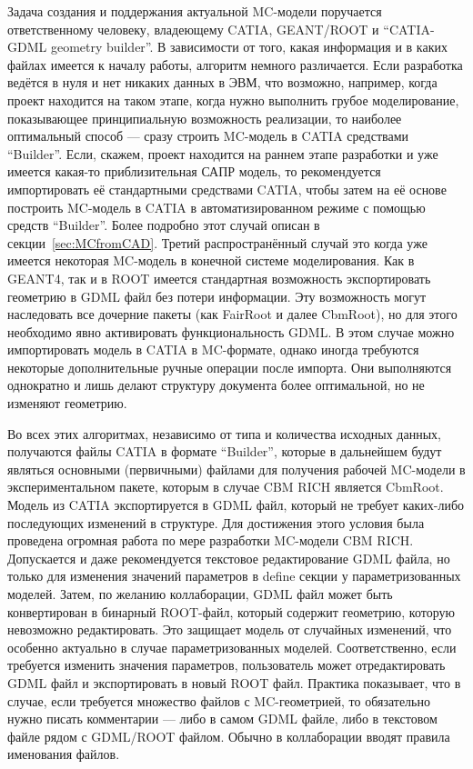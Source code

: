 Задача создания и поддержания актуальной MC-модели поручается ответственному человеку, владеющему CATIA, GEANT/ROOT и ``CATIA-GDML geometry builder''. В зависимости от того, какая информация и в каких файлах имеется к началу работы, алгоритм немного различается. Если разработка ведётся в нуля и нет никаких данных в ЭВМ, что возможно, например, когда проект находится на таком этапе, когда нужно выполнить грубое моделирование, показывающее принципиальную возможность реализации, то наиболее оптимальный способ --- сразу строить MC-модель в CATIA средствами ``Builder''. Если, скажем, проект находится на раннем этапе разработки и уже имеется какая-то приблизительная САПР модель, то рекомендуется импортировать её стандартными средствами CATIA, чтобы затем на её основе построить MC-модель в CATIA в автоматизированном режиме с помощью средств ``Builder''. Более подробно этот случай описан в секции~\ref{sec:MCfromCAD}. Третий распространённый случай это когда уже имеется некоторая MC-модель в конечной системе моделирования. Как в GEANT4, так и в ROOT имеется стандартная возможность экспортировать геометрию в GDML файл без потери информации. Эту возможность могут наследовать все дочерние пакеты (как FairRoot и далее CbmRoot), но для этого необходимо явно активировать функциональность GDML. В этом случае можно импортировать модель в CATIA в MC-формате, однако иногда требуются некоторые дополнительные ручные операции после импорта. Они выполняются однократно и лишь делают структуру документа более оптимальной, но не изменяют геометрию.

Во всех этих алгоритмах, независимо от типа и количества исходных данных, получаются файлы CATIA в формате ``Builder'', которые в дальнейшем будут являться основными (первичными) файлами для получения рабочей MC-модели в экспериментальном пакете, которым в случае CBM RICH является CbmRoot. Модель из CATIA экспортируется в GDML файл, который не требует каких-либо последующих изменений в структуре. Для достижения этого условия была проведена огромная работа по мере разработки MC-модели CBM RICH. Допускается и даже рекомендуется текстовое редактирование GDML файла, но только для изменения значений параметров в define секции у параметризованных моделей. Затем, по желанию коллаборации, GDML файл может быть конвертирован в бинарный ROOT-файл, который содержит геометрию, которую невозможно редактировать. Это защищает модель от случайных изменений, что особенно актуально в случае параметризованных моделей. Соответственно, если требуется изменить значения параметров, пользователь может отредактировать GDML файл и экспортировать в новый ROOT файл. Практика показывает, что в случае, если требуется множество файлов с MC-геометрией, то обязательно нужно писать комментарии --- либо в самом GDML файле, либо в текстовом файле рядом с GDML/ROOT файлом. Обычно в коллаборации вводят правила именования файлов.

